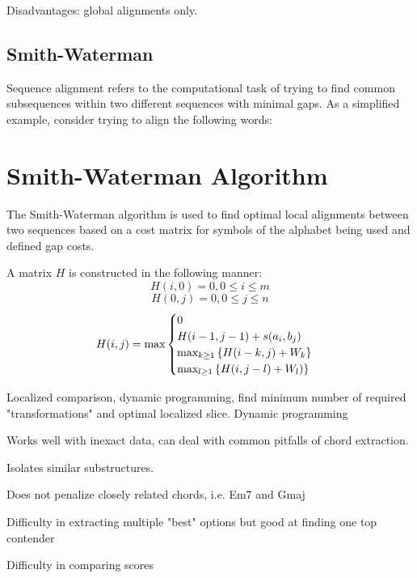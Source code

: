 \item Disadvantages: global alignments only.

\subsection{Smith-Waterman}

Sequence alignment refers to the computational task of trying to find common subsequences within two different sequences with minimal gaps. As a simplified example, consider trying to align the following words:


\section{Smith-Waterman Algorithm}

The Smith-Waterman algorithm is used to find optimal local alignments between two sequences based on a cost matrix for symbols of the alphabet being used and defined gap costs.

A matrix $H$ is constructed in the following manner:
\[ H(i,0) = 0, 0 \leq i \leq m \]
\[ H(0,j) = 0, 0 \leq j \leq n \]
\[ H(i,j) = \hbox{max} \begin{cases} 0 \\ H(i-1,j-1)+s(a_i,b_j) \\ \hbox{max}_{k \geq 1} \left\{ H(i-k,j)+W_k \right\} \\ \hbox{max}_{l \geq 1}\left\{ H(i, j-l)+W_l) \right\} \end{cases}  \]

\item Localized comparison, dynamic programming, find minimum number of required "transformations" and optimal localized slice. Dynamic programming

\item Works well with inexact data, can deal with common pitfalls of chord extraction.

\item Isolates similar substructures.

\item Does not penalize closely related chords, i.e. Em7 and Gmaj

\item Difficulty in extracting multiple "best" options but good at finding one top contender

\item Difficulty in comparing scores

